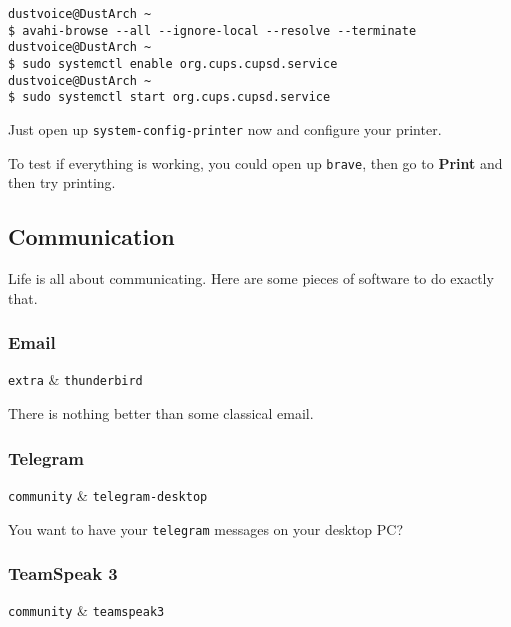 \documentclass[10pt]{dustdoc}
\begin{document}
\begin{verbatim}
dustvoice@DustArch ~
$ avahi-browse --all --ignore-local --resolve --terminate
dustvoice@DustArch ~
$ sudo systemctl enable org.cups.cupsd.service
dustvoice@DustArch ~
$ sudo systemctl start org.cups.cupsd.service
\end{verbatim}

Just open up \texttt{system-config-printer} now and configure your printer.

To test if everything is working, you could open up \texttt{brave}, then go to \textbf{Print} and then try printing.

\subsection{Communication}
\label{sec:gui-communication}

Life is all about communicating.
Here are some pieces of software to do exactly that.

\subsubsection{Email}
\label{sec:email}

\begin{packagetable}
    \texttt{extra} & \texttt{thunderbird} \\
\end{packagetable}

There is nothing better than some classical email.

\subsubsection{Telegram}
\label{sec:telegram}

\begin{packagetable}
    \texttt{community} & \texttt{telegram-desktop} \\
\end{packagetable}

You want to have your \texttt{telegram} messages on your desktop PC?

\subsubsection{TeamSpeak 3}
\label{sec:teamspeak-3}

\begin{packagetable}
    \texttt{community} & \texttt{teamspeak3} \\
\end{packagetable}
\end{document}
